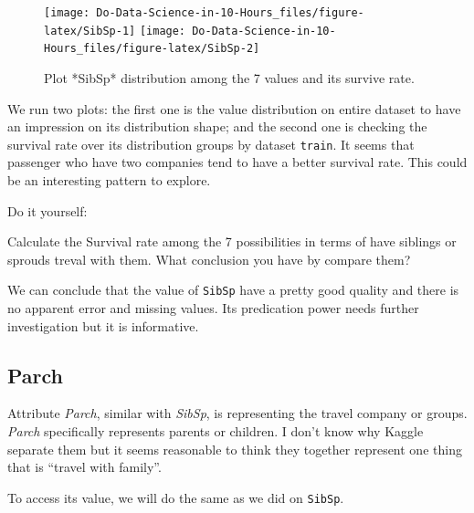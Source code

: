 \documentclass[
]{book}
\makeatletter
\newenvironment{Shaded}{\begin{snugshade}}{\end{snugshade}}
\newcommand{\CommentTok}[1]{\textcolor[rgb]{0.56,0.35,0.01}{\textit{#1}}}
\newcommand{\KeywordTok}[1]{\textcolor[rgb]{0.13,0.29,0.53}{\textbf{#1}}}
\newcommand{\NormalTok}[1]{#1}
\newcommand{\OperatorTok}[1]{\textcolor[rgb]{0.81,0.36,0.00}{\textbf{#1}}}
\newenvironment{kframe}{%
\medskip{}
\setlength{\fboxsep}{.8em}
 \def\at@end@of@kframe{}%
 \ifinner\ifhmode%
  \def\at@end@of@kframe{\end{minipage}}%
  \begin{minipage}{\columnwidth}%
 \fi\fi%
 \def\FrameCommand##1{\hskip\@totalleftmargin \hskip-\fboxsep
 \colorbox{shadecolor}{##1}\hskip-\fboxsep
     \hskip-\linewidth \hskip-\@totalleftmargin \hskip\columnwidth}%
 \MakeFramed {\advance\hsize-\width
   \@totalleftmargin\z@ \linewidth\hsize
   \@setminipage}}%
 {\par\unskip\endMakeFramed%
 \at@end@of@kframe}
\newenvironment{rmdblock}[1]
  {
  \begin{itemize}
  \renewcommand{\labelitemi}{
    \raisebox{-.7\height}[0pt][0pt]{
      {\setkeys{Gin}{width=3em,keepaspectratio}\texttt{[image: images/\#1]}}
    }
  }
  \setlength{\fboxsep}{1em}
  \begin{kframe}
  \item
  }
  {
  \end{kframe}
  \end{itemize}
  }
\newenvironment{rmdaction}
  {\begin{rmdblock}{action}}
  {\end{rmdblock}}
\makeatother
\begin{document}
\begin{figure}

{\centering \texttt{[image: Do-Data-Science-in-10-Hours\_files/figure-latex/SibSp-1]} \texttt{[image: Do-Data-Science-in-10-Hours\_files/figure-latex/SibSp-2]} 

}

\caption{Plot *SibSp* distribution among the 7 values and its survive rate.}\label{fig:SibSp}
\end{figure}

We run two plots: the first one is the value distribution on entire dataset to have an impression on its distribution shape; and the second one is checking the survival rate over its distribution groups by dataset \texttt{train}. It seems that passenger who have two companies tend to have a better survival rate. This could be an interesting pattern to explore.

\begin{rmdaction}
Do it yourself:

Calculate the Survival rate among the 7 possibilities in terms of have siblings or sprouds treval with them. What conclusion you have by compare them?
\end{rmdaction}

We can conclude that the value of \texttt{SibSp} have a pretty good quality and there is no apparent error and missing values. Its predication power needs further investigation but it is informative.

\hypertarget{parch}{%
\subsection{Parch}\label{parch}}

Attribute \emph{Parch}, similar with \emph{SibSp}, is representing the travel company or groups. \emph{Parch} specifically represents parents or children. I don't know why Kaggle separate them but it seems reasonable to think they together represent one thing that is ``travel with family''.

To access its value, we will do the same as we did on \texttt{SibSp}.

\begin{Shaded}
\end{Shaded}
\end{document}
